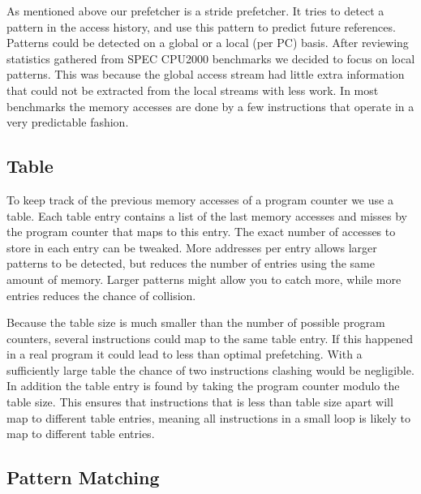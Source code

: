 As mentioned above our prefetcher is a stride prefetcher. It tries to detect a
pattern in the access history, and use this pattern to predict future
references. Patterns could be detected on a global or a local (per PC) basis.
After reviewing statistics gathered from SPEC CPU2000 benchmarks we decided to
focus on local patterns. This was because the global access stream had little
extra information that could not be extracted from the local streams with less
work. In most benchmarks the memory accesses are done by a few instructions
that operate in a very predictable fashion.

\subsection{Table}

To keep track of the previous memory accesses of a program counter we use a
table. Each table entry contains a list of the last memory accesses
and misses by the program counter that maps to this entry.
The exact number of accesses to store in each entry can be tweaked.
More addresses per entry allows larger patterns to be detected,
but reduces the number of entries using the same amount of memory.
Larger patterns might allow you to catch more, while more entries
reduces the chance of collision.

Because the table size is much smaller
than the number of possible program counters, several instructions could map to
the same table entry. If this happened in a real program it could lead to less
than optimal prefetching. With a sufficiently large table the chance of two
instructions clashing would be negligible. In addition the table entry is found
by taking the program counter modulo the table size. This ensures that
instructions that is less than table size apart will map to different table
entries, meaning all instructions in a small loop is likely to map to different
table entries.

\subsection{Pattern Matching}

